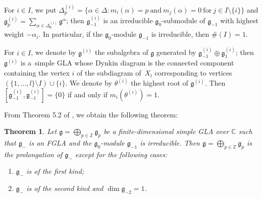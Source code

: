 \documentclass[11pt]{article}
\newtheorem{theorem}{Theorem}
\numberwithin{equation}{section}
\numberwithin{theorem}{section}
\numberwithin{proposition}{section}
\numberwithin{lemma}{section}
\numberwithin{corollary}{section}
\numberwithin{definition}{section}
\numberwithin{example}{section}
\numberwithin{remark}{section}
\numberwithin{note}{section}
\newcommand{\gla}[1]{\mathfrak#1=\bigoplus\limits_{p\in\mathbb Z}\mathfrak#1_p} \renewcommand{\labelenumi}{{\rm (\arabic{enumi})}}
\begin{document}
For $i\in I$, we put $\Delta_p^{(i)}=\{\alpha\in\Delta:
m_i(\alpha)=p\ \text{and}\ m_j(\alpha)=
0\ \text{for}\ j\in I\setminus\{i\} \}$ and
$\mathfrak g_p^{(i)}=\sum\limits_{\alpha\in\Delta_p^{(i)}}\mathfrak g^\alpha$;
then
$\mathfrak g_{-1}^{(i)}$ is an irreducible
$\mathfrak g_0$-submodule of $\mathfrak g_{-1}$ with
highest weight $-\alpha_i$.
In particular, if the $\mathfrak g_0$-module $\mathfrak g_{-1}$
is irreducible, then $\#(I)=1$.

{\samepage For $i\in I$,
we denote by $\mathfrak g^{(i)}$ the subalgebra of $\mathfrak g$ generated by
$\mathfrak g_{-1}^{(i)}\oplus \mathfrak g_{1}^{(i)}$;
then $\mathfrak g^{(i)}$ is a~simple GLA whose
Dynkin diagram is the connected component containing the vertex $i$ of
the sub\-diagram of~$X_l$
corresponding to vertices $(\{1,\dots,l\}\setminus I)\cup\{i\}$.
We denote by $\theta^{(i)}$ the highest root of $\mathfrak g^{(i)}$.
Then $[\mathfrak g_{-1}^{(i)},\mathfrak g_{-1}^{(i)}]=\{0\}$ if and only if
$m_i(\theta^{(i)})=1$.

}

From Theorem 5.2 of \cite{yam93:1}, we obtain the following theorem:
\begin{theorem}\label{thm5.1}
Let $\gla g$ be a finite-dimensional simple GLA over $\mathbb C$ such that
$\mathfrak g_-$ is an FGLA and
the $\mathfrak g_0$-module $\mathfrak g_{-1}$
is irreducible.
Then $\gla g$ is the prolongation of $\mathfrak g_-$ except for
the following cases:
\begin{enumerate}\itemsep=0pt
\renewcommand{\labelenumi}{$(\alph{enumi})$}
\item $\mathfrak g_-$ is of the first kind;
\item $\mathfrak g_-$ is of the second kind and $\dim\mathfrak g_{-2}=1$.
\end{enumerate}
\end{theorem}
\end{document}
